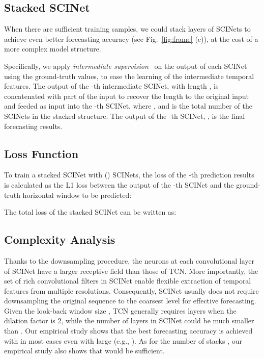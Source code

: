 \documentclass{article}
\newcommand{\red}[1]{\textcolor{red}{#1}}
\begin{document}
\subsection{Stacked SCINet}
\label{sec:stacked_scinet}

When there are sufficient training samples, we could stack  layers of SCINets to achieve even better forecasting accuracy (see Fig.~\ref{fig:frame} (c)), at the cost of a more complex model structure. 

\iffalse
When the length of the look-back window  is comparable with the length of the prediction horizon , it would be difficult for a single SCINet to fully capture the temporal dependencies. 
\red{To keep the continuous temporal correlations between the look-back window and the target prediction horizon, meanwhile fully accumulate the historical information within the look-back window, we can further stack  SCINets end-to-end to form the \textit{Stacked SCINet} structure,
as illustrated in Fig.~\ref{fig:frame} (c). } 
\fi

Specifically, we apply \textit{intermediate supervision}~\citep{bai2018trellis} on the output of each SCINet using the ground-truth values, to ease the learning of the intermediate temporal features.
The output of the -th intermediate SCINet,  with length , is concatenated with part of the input  to recover the length to the original input and feeded as input into the -th SCINet, where , and  is the total number of the SCINets in the stacked structure.
The output of the -th SCINet, , is the final forecasting results. 



\subsection{Loss Function}
To train a stacked SCINet with  () SCINets, the loss of the -th prediction results is calculated as the L1 loss between the output of the -th SCINet and the ground-truth horizontal window to be predicted:





The total loss of the stacked SCINet can be written as:



\subsection{Complexity Analysis}
Thanks to the downsampling procedure, the neurons at each convolutional layer of SCINet have a larger receptive field than those of TCN. More importantly, the set of rich convolutional filters in SCINet enable flexible extraction of temporal features from multiple resolutions. Consequently, SCINet usually does not require downsampling the original sequence to the coarsest level for effective forecasting. Given the look-back window size , TCN generally requires  layers when the dilation factor is 2, while the number of layers  in SCINet could be much smaller than . Our empirical study shows that the best forecasting accuracy is achieved with  in most cases even with large  (e.g., ). As for the number of stacks , our empirical study also shows that  would be sufficient.
\end{document}
